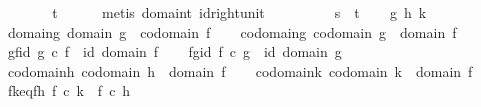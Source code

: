 \begin{isabellebody}
\ \ \isamarkupfalse%
\ \isamarkupfalse%
\ {\isachardoublequoteopen}{\isachardot}{\kern0pt}{\isachardot}{\kern0pt}{\isachardot}{\kern0pt}\ {\isacharequal}{\kern0pt}\ t{\isachardoublequoteclose}\isanewline
\ \ \ \ \isamarkupfalse%
\ {\isacharparenleft}{\kern0pt}metis\ domain{\isacharunderscore}{\kern0pt}t\ id{\isacharunderscore}{\kern0pt}right{\isacharunderscore}{\kern0pt}unit{\isacharparenright}{\kern0pt}\ \ \ \ \isanewline
\ \ \isamarkupfalse%
\ \isamarkupfalse%
\ {\isachardoublequoteopen}s\ {\isacharequal}{\kern0pt}\ t{\isachardoublequoteclose}\isacommand{{\isachardot}{\kern0pt}}\isamarkupfalse%
\isanewline
{}\isamarkupfalse%
\isanewline
\ \ \isamarkupfalse%
\ g\ h\ k\isanewline
\ \ \isamarkupfalse%
\ domain{\isacharunderscore}{\kern0pt}g{\isacharcolon}{\kern0pt}\ {\isachardoublequoteopen}domain\ g\ {\isacharequal}{\kern0pt}\ codomain\ f{\isachardoublequoteclose}\isanewline
\ \ \isamarkupfalse%
\ codomain{\isacharunderscore}{\kern0pt}g{\isacharcolon}{\kern0pt}\ {\isachardoublequoteopen}codomain\ g\ {\isacharequal}{\kern0pt}\ domain\ f{\isachardoublequoteclose}\isanewline
\ \ \isamarkupfalse%
\ gf{\isacharunderscore}{\kern0pt}id{\isacharcolon}{\kern0pt}\ {\isachardoublequoteopen}g\ {\isasymcirc}\isactrlsub c\ f\ {\isacharequal}{\kern0pt}\ id\ {\isacharparenleft}{\kern0pt}domain\ f{\isacharparenright}{\kern0pt}{\isachardoublequoteclose}\isanewline
\ \ \isamarkupfalse%
\ fg{\isacharunderscore}{\kern0pt}id{\isacharcolon}{\kern0pt}\ {\isachardoublequoteopen}f\ {\isasymcirc}\isactrlsub c\ g\ {\isacharequal}{\kern0pt}\ id\ {\isacharparenleft}{\kern0pt}domain\ g{\isacharparenright}{\kern0pt}{\isachardoublequoteclose}\isanewline
\ \ \isamarkupfalse%
\ codomain{\isacharunderscore}{\kern0pt}h{\isacharcolon}{\kern0pt}\ {\isachardoublequoteopen}codomain\ h\ {\isacharequal}{\kern0pt}\ domain\ f{\isachardoublequoteclose}\isanewline
\ \ \isamarkupfalse%
\ codomain{\isacharunderscore}{\kern0pt}k{\isacharcolon}{\kern0pt}\ {\isachardoublequoteopen}codomain\ k\ {\isacharequal}{\kern0pt}\ domain\ f{\isachardoublequoteclose}\isanewline
\ \ \isamarkupfalse%
\ fk{\isacharunderscore}{\kern0pt}eq{\isacharunderscore}{\kern0pt}fh{\isacharcolon}{\kern0pt}\ {\isachardoublequoteopen}f\ {\isasymcirc}\isactrlsub c\ k\ {\isacharequal}{\kern0pt}\ f\ {\isasymcirc}\isactrlsub c\ h{\isachardoublequoteclose}\isanewline
\isanewline
\ \ \isamarkupfalse%

\end{isabellebody}
